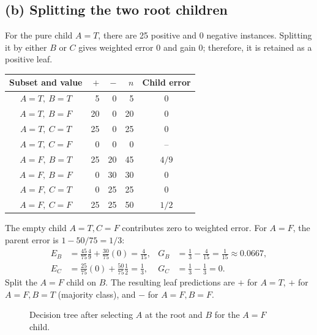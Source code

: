 \documentclass[11pt,a4paper]{article}
\begin{document}
\subsection*{(b) Splitting the two root children}
For the pure child \(A=T\), there are 25 positive and 0 negative instances. Splitting it by either \(B\) or \(C\) gives weighted error 0 and gain 0; therefore, it is retained as a positive leaf.

\begin{center}
\small
\begin{tabular}{c|r r|r|c}
\toprule
Subset and value & \(+\)&\(-\)&\(n\)&Child error\\
\midrule
\(A=T,\ B=T\)&5&0&5&0\\
\(A=T,\ B=F\)&20&0&20&0\\
\(A=T,\ C=T\)&25&0&25&0\\
\(A=T,\ C=F\)&0&0&0&--\\
\(A=F,\ B=T\)&25&20&45&\(4/9\)\\
\(A=F,\ B=F\)&0&30&30&0\\
\(A=F,\ C=T\)&0&25&25&0\\
\(A=F,\ C=F\)&25&25&50&\(1/2\)\\
\bottomrule
\end{tabular}
\end{center}
The empty child \(A=T,C=F\) contributes zero to weighted error. For \(A=F\), the parent error is \(1-50/75=1/3\):
\[
\begin{aligned}
E_B&=\frac{45}{75}\frac49+\frac{30}{75}(0)=\frac4{15},
&G_B&=\frac13-\frac4{15}=\frac1{15}\approx0.0667,\\
E_C&=\frac{25}{75}(0)+\frac{50}{75}\frac12=\frac13,
&G_C&=\frac13-\frac13=0.
\end{aligned}
\]
Split the \(A=F\) child on \(B\). The resulting leaf predictions are \(+\) for \(A=T\), \(+\) for \(A=F,B=T\) (majority class), and \(-\) for \(A=F,B=F\).

\begin{figure}[H]
\centering
{}
\caption{Decision tree after selecting \(A\) at the root and \(B\) for the \(A=F\) child.}
\label{fig:decision-tree}
\end{figure}
\end{document}
